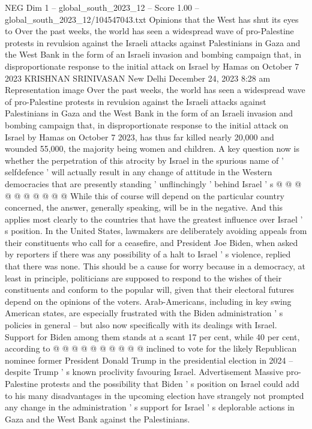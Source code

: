 \begin{textsample}{NEG Dim 1 – global\_south\_2023\_12 – Score 1.00 – global\_south\_2023\_12/104547043.txt}  \label{ex:f1_neg_291}
Opinions that the West has shut its eyes to Over the past weeks, the world has seen a widespread wave of pro-Palestine protests in revulsion against the Israeli attacks against Palestinians in Gaza and the West Bank in the form of an Israeli invasion and bombing campaign that, in disproportionate response to the initial attack on Israel by Hamas on October 7 2023 KRISHNAN SRINIVASAN New Delhi December 24, 2023 8:28 am Representation image Over the past weeks, the world has seen a widespread wave of pro-Palestine protests in revulsion against the Israeli attacks against Palestinians in Gaza and the West Bank in the form of an Israeli invasion and bombing campaign that, in disproportionate response to the initial attack on Israel by Hamas on October 7 2023, has thus far killed nearly 20,000 and wounded 55,000, the majority being women and children.
A key question now is whether the perpetration of this atrocity by Israel in the spurious name of ' selfdefence ' will actually result in any change of attitude in the Western democracies that are presently standing ' unflinchingly ' behind Israel ' s @ @ @ @ @ @ @ @ @ @ While this of course will depend on the particular country concerned, the answer, generally speaking, will be in the negative.
And this applies most clearly to the countries that have the greatest influence over Israel ' s position.
In the United States, lawmakers are deliberately avoiding appeals from their constituents who call for a ceasefire, and President Joe Biden, when asked by reporters if there was any possibility of a halt to Israel ' s violence, replied that there was none.
This should be a cause for worry because in a democracy, at least in principle, politicians are supposed to respond to the wishes of their constituents and conform to the popular will, given that their electoral futures depend on the opinions of the voters.
Arab-Americans, including in key swing American states, are especially frustrated with the Biden administration ' s policies in general -- but also now specifically with its dealings with Israel.
Support for Biden among them stands at a scant 17 per cent, while 40 per cent, according to @ @ @ @ @ @ @ @ @ @ inclined to vote for the likely Republican nominee former President Donald Trump in the presidential election in 2024 -- despite Trump ' s known proclivity favouring Israel.
Advertisement Massive pro-Palestine protests and the possibility that Biden ' s position on Israel could add to his many disadvantages in the upcoming election have strangely not prompted any change in the administration ' s support for Israel ' s deplorable actions in Gaza and the West Bank against the Palestinians.

\end{textsample}
